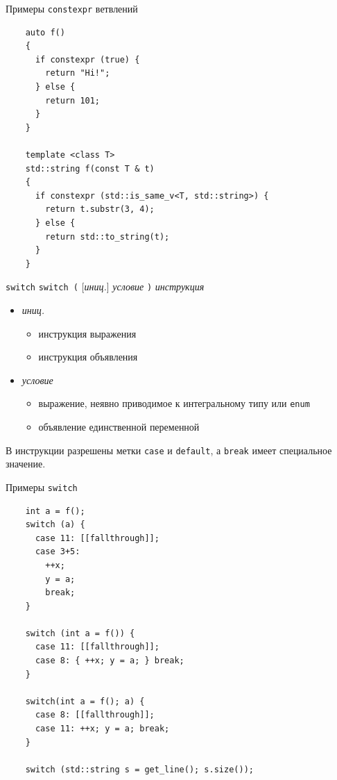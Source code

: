 \documentclass[unknownkeysallowed,xcolor=table]{beamer}
\begin{document}
\begin{frame}[fragile]{Примеры \lstinline{constexpr} ветвлений}
  \begin{lstlisting}
    auto f()
    {
      if constexpr (true) {
        return "Hi!";
      } else {
        return 101;
      }
    }

    template <class T>
    std::string f(const T & t)
    {
      if constexpr (std::is_same_v<T, std::string>) {
        return t.substr(3, 4);
      } else {
        return std::to_string(t);
      }
    }
  \end{lstlisting}
\end{frame}

\begin{frame}[fragile]{\lstinline{switch}}
  \lstinline{switch (} [\emph{иниц.}] \emph{условие} \lstinline{)} \emph{инструкция}

  \vspace{0.5em}

  \begin{itemize}
    \item \emph{иниц.}
      \begin{itemize}
        \item инструкция выражения \vspace{0.5em}
        \item инструкция объявления \vspace{1em}
      \end{itemize}
    \item \emph{условие}
      \begin{itemize}
        \item выражение, неявно приводимое к интегральному типу или \lstinline{enum} \vspace{0.5em}
        \item объявление единственной переменной
      \end{itemize}
  \end{itemize}

  \vspace{1em}

  В инструкции разрешены метки \lstinline{case} и \lstinline{default}, а \lstinline{break} имеет специальное значение.
\end{frame}

\begin{frame}[fragile]{Примеры \lstinline{switch}}
  \begin{lstlisting}
    int a = f();
    switch (a) {
      case 11: [[fallthrough]];
      case 3+5:
        ++x;
        y = a;
        break;
    }

    switch (int a = f()) {
      case 11: [[fallthrough]];
      case 8: { ++x; y = a; } break;
    }

    switch(int a = f(); a) {
      case 8: [[fallthrough]];
      case 11: ++x; y = a; break;
    }

    switch (std::string s = get_line(); s.size());
  \end{lstlisting}
\end{frame}
\end{document}
